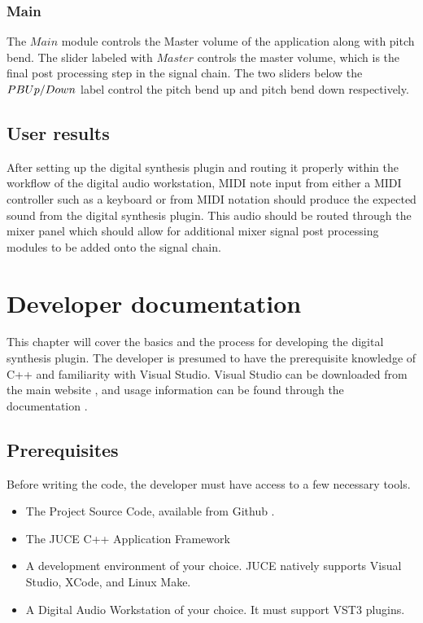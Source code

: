 \documentclass[a4paper,12pt]{report}
\begin{document}
\subsection{Main}
\label{subsec:main}
The $Main$ module controls the Master volume of the application along with pitch bend. The slider labeled with $Master$ controls the master volume, which is the final post processing step in the signal chain. The two sliders below the $PB \-Up/Down$ label control the pitch bend up and pitch bend down respectively.

\section{User results}
After setting up the digital synthesis plugin and routing it properly within the workflow of the digital audio workstation, MIDI note input from either a MIDI controller such as a keyboard or from MIDI notation should produce the expected sound from the digital synthesis plugin. This audio should be routed through the mixer panel which should allow for additional mixer signal post processing modules to be added onto the signal chain.

\chapter{Developer documentation}
\label{chapter:devdocs}
This chapter will cover the basics and the process for developing the digital synthesis plugin. The developer is presumed to have the prerequisite knowledge of C++ and familiarity with Visual Studio. Visual Studio can be downloaded from the main website \cite{visualstudio}, and usage information can be found through the documentation \cite{vsdocs}.

\section{Prerequisites}
\label{sec:prereq}
Before writing the code, the developer must have access to a few necessary tools.
\begin{itemize}
\item The Project Source Code, available from Github \cite{github}.
\item The JUCE C++ Application Framework \cite{madewithjuce}
\item A development environment of your choice. JUCE natively supports Visual Studio, XCode, and Linux Make.
\item A Digital Audio Workstation of your choice. It must support VST3 plugins.
\end{itemize}
\end{document}
